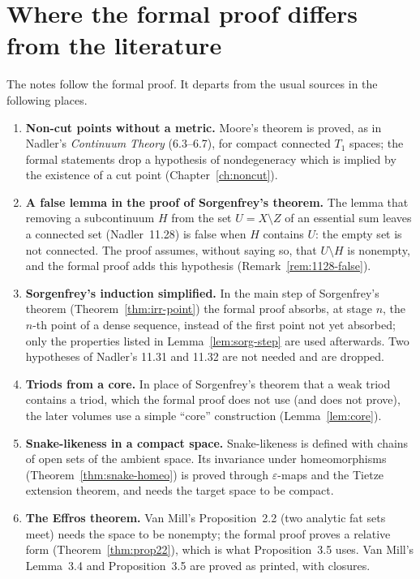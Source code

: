 \section{Where the formal proof differs from the literature}\label{sec:intro-diff}

The notes follow the formal proof. It departs from the usual sources in the following places.

\begin{enumerate}
\item \textbf{Non-cut points without a metric.} Moore's theorem is proved, as in Nadler's
\emph{Continuum Theory} (6.3--6.7), for compact connected $T_1$ spaces; the formal statements drop a
hypothesis of nondegeneracy which is implied by the existence of a cut point
(Chapter~\ref{ch:noncut}).
\item \textbf{A false lemma in the proof of Sorgenfrey's theorem.} The lemma that removing a
subcontinuum $H$ from the set $U=X\setminus Z$ of an essential sum leaves a connected set
(Nadler~11.28) is false when $H$ contains $U$: the empty set is not connected. The proof assumes,
without saying so, that $U\setminus H$ is nonempty, and the formal proof adds this hypothesis
(Remark~\ref{rem:1128-false}).
\item \textbf{Sorgenfrey's induction simplified.} In the main step of Sorgenfrey's theorem
(Theorem~\ref{thm:irr-point}) the formal proof absorbs, at stage $n$, the $n$-th point of a dense
sequence, instead of the first point not yet absorbed; only the properties listed in
Lemma~\ref{lem:sorg-step} are used afterwards. Two hypotheses of Nadler's 11.31 and 11.32 are not
needed and are dropped.
\item \textbf{Triods from a core.} In place of Sorgenfrey's theorem that a weak triod contains a
triod, which the formal proof does not use (and does not prove), the later volumes use a simple
``core'' construction (Lemma~\ref{lem:core}).
\item \textbf{Snake-likeness in a compact space.} Snake-likeness is defined with chains of open
sets of the ambient space. Its invariance under homeomorphisms (Theorem~\ref{thm:snake-homeo}) is
proved through $\varepsilon$-maps and the Tietze extension theorem, and needs the target space to
be compact.
\item \textbf{The Effros theorem.} Van Mill's Proposition~2.2 (two analytic fat sets meet) needs
the space to be nonempty; the formal proof proves a relative form (Theorem~\ref{thm:prop22}),
which is what Proposition~3.5 uses. Van Mill's Lemma~3.4 and Proposition~3.5 are proved as
printed, with closures.
\end{enumerate}

